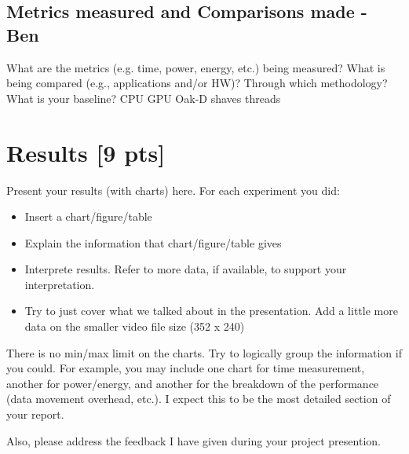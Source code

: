\documentclass[sigconf,authorversion,nonacm]{acmart}
\begin{document}
\subsection{Metrics measured and Comparisons made - Ben}
What are the metrics (e.g. time, power, energy, etc.) being measured? What is being compared (e.g., applications and/or HW)? Through which methodology? What is your baseline?
CPU GPU Oak-D shaves threads

\section{Results {\small {[9 pts]}}}  
Present your results (with charts) here. For each experiment you did:
\begin{itemize}
    \item Insert a chart/figure/table 
    \item Explain the information that chart/figure/table gives
    \item Interprete results. Refer to more data, if available, to support your interpretation. 
    \item Try to just cover what we talked about in the presentation. Add a little more data on the smaller video file size (352 x 240)
\end{itemize}

There is no min/max limit on the charts. Try to logically group the information if you could. For example, you may include one chart for time measurement, another for power/energy, and another for the breakdown of the performance (data movement overhead, etc.). I expect this to be the most detailed section of your report.

Also, please address the feedback I have given during your project presention.
\end{document}
